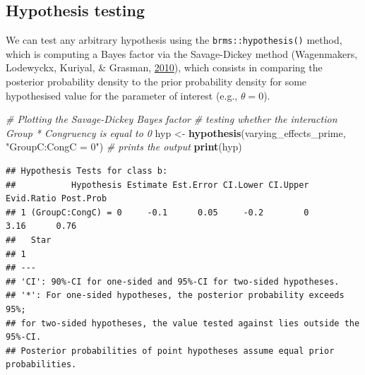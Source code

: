 \documentclass[
  11pt,
  english,
  ,doc,floatsintext]{apa6}
\newenvironment{Shaded}{}{}
\newcommand{\CommentTok}[1]{\textcolor[rgb]{0.38,0.63,0.69}{\textit{#1}}}
\newcommand{\KeywordTok}[1]{\textcolor[rgb]{0.00,0.44,0.13}{\textbf{#1}}}
\newcommand{\NormalTok}[1]{#1}
\newcommand{\StringTok}[1]{\textcolor[rgb]{0.25,0.44,0.63}{#1}}
\begin{document}
\newpage

\hypertarget{hypothesis-testing}{%
\subsection{Hypothesis testing}\label{hypothesis-testing}}

We can test any arbitrary hypothesis using the \texttt{brms::hypothesis()} method, which is computing a Bayes factor via the Savage-Dickey method (Wagenmakers, Lodewyckx, Kuriyal, \& Grasman, \protect\hyperlink{ref-wagenmakers_bayesian_2010}{2010}), which consists in comparing the posterior probability density to the prior probability density for some hypothesised value for the parameter of interest (e.g., \(\theta = 0\)).

\begin{Shaded}
\begin{Highlighting}[]
\CommentTok{# Plotting the Savage-Dickey Bayes factor}
\CommentTok{# testing whether the interaction Group * Congruency is equal to 0}
\NormalTok{hyp <-}\StringTok{ }\KeywordTok{hypothesis}\NormalTok{(varying_effects_prime, }\StringTok{"GroupC:CongC = 0"}\NormalTok{)}
\CommentTok{# prints the output}
\KeywordTok{print}\NormalTok{(hyp)}
\end{Highlighting}
\end{Shaded}

\begin{verbatim}
## Hypothesis Tests for class b:
##           Hypothesis Estimate Est.Error CI.Lower CI.Upper Evid.Ratio Post.Prob
## 1 (GroupC:CongC) = 0     -0.1      0.05     -0.2        0       3.16      0.76
##   Star
## 1     
## ---
## 'CI': 90%-CI for one-sided and 95%-CI for two-sided hypotheses.
## '*': For one-sided hypotheses, the posterior probability exceeds 95%;
## for two-sided hypotheses, the value tested against lies outside the 95%-CI.
## Posterior probabilities of point hypotheses assume equal prior probabilities.
\end{verbatim}
\end{document}
